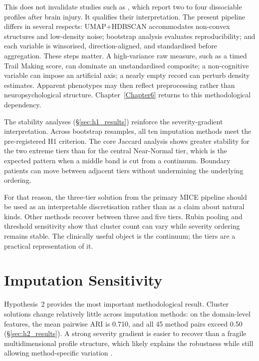 This does not invalidate studies such as \textcite{garcia2020data}, which report two to four dissociable profiles after brain injury. It qualifies their interpretation. The present pipeline differs in several respects: UMAP+HDBSCAN accommodates non-convex structures and low-density noise; bootstrap analysis evaluates reproducibility; and each variable is winsorised, direction-aligned, and standardised before aggregation. These steps matter. A high-variance raw measure, such as a timed Trail Making score, can dominate an unstandardised composite; a non-cognitive variable can impose an artificial axis; a nearly empty record can perturb density estimates. Apparent phenotypes may then reflect preprocessing rather than neuropsychological structure. Chapter~\ref{Chapter6} returns to this methodological dependency.

The stability analyses (§\ref{sec:h1_results}) reinforce the severity-gradient interpretation. Across bootstrap resamples, all ten imputation methods meet the pre-registered H1 criterion. The core Jaccard analysis shows greater stability for the two extreme tiers than for the central Near-Normal tier, which is the expected pattern when a middle band is cut from a continuum. Boundary patients can move between adjacent tiers without undermining the underlying ordering.

For that reason, the three-tier solution from the primary MICE pipeline should be used as an interpretable discretisation rather than as a claim about natural kinds. Other methods recover between three and five tiers. Rubin pooling and threshold sensitivity show that cluster count can vary while severity ordering remains stable. The clinically useful object is the continuum; the tiers are a practical representation of it.


\section{Imputation Sensitivity}

Hypothesis~2 provides the most important methodological result. Cluster solutions change relatively little across imputation methods: on the domain-level features, the mean pairwise ARI is 0.710, and all 45 method pairs exceed 0.50 (§\ref{sec:h2_results}). A strong severity gradient is easier to recover than a fragile multidimensional profile structure, which likely explains the robustness while still allowing method-specific variation \parencite{rubin1987multiple}.

